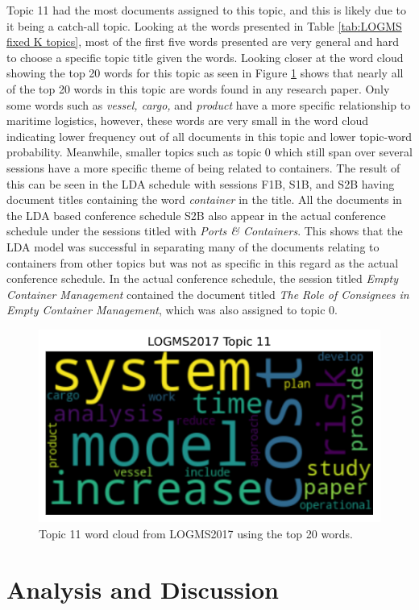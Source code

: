 \documentclass[a4paper, 12pt, twoside]{article}
\numberwithin{equation}{section} %
\begin{document}
Topic 11 had the most documents assigned to this topic, and this is likely due to it being a catch-all topic. Looking at the words presented in Table \ref{tab:LOGMS fixed K topics}, most of the first five words presented are very general and hard to choose a specific topic title given the words. Looking closer at the word cloud showing the top 20 words for this topic as seen in Figure \ref{fig:LOGMS 11 expanded} shows that nearly all of the top 20 words in this topic are words found in any research paper. Only some words such as \textit{vessel, cargo,} and \textit{product} have a more specific relationship to maritime logistics, however, these words are very small in the word cloud indicating lower frequency out of all documents in this topic and lower topic-word probability. Meanwhile, smaller topics such as topic 0 which still span over several sessions have a more specific theme of being related to containers. The result of this can be seen in the LDA schedule with sessions F1B, S1B, and S2B having document titles containing the word \textit{container} in the title. All the documents in the LDA based conference schedule S2B also appear in the actual conference schedule under the sessions titled with \textit{Ports \& Containers}. This shows that the LDA model was successful in separating many of the documents relating to containers from other topics but was not as specific in this regard as the actual conference schedule. In the actual conference schedule, the session titled \textit{Empty Container Management} contained the document titled \textit{The Role of Consignees in Empty Container Management}, which was also assigned to topic 0. 

\begin{figure}[H]

  \centering
  \includegraphics[width=0.5\linewidth]{LOGMS_11.png}
\caption[LOGMS2017 conference K topic 11 word cloud]{Topic 11 word cloud from LOGMS2017 using the top 20 words.}
\label{fig:LOGMS 11 expanded}
\end{figure}

\section{Analysis and Discussion}
\end{document}
